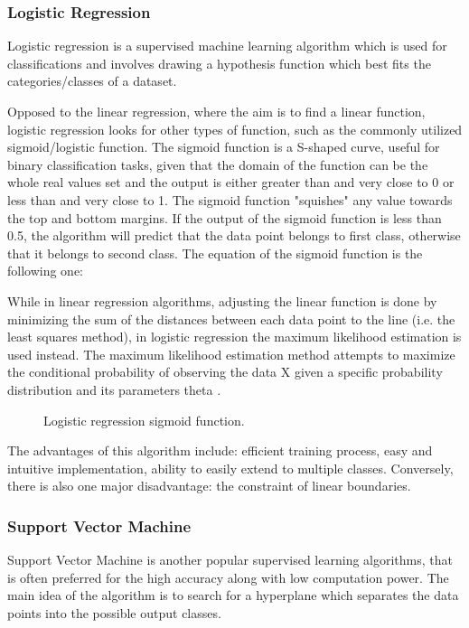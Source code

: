 \subsubsection{Logistic Regression}
Logistic regression is a supervised machine learning algorithm which is used for classifications and involves drawing a hypothesis function which best fits the categories/classes of a dataset. 

Opposed to the linear regression, where the aim is to find a linear function, logistic regression looks for other types of function, such as the commonly utilized sigmoid/logistic function. The sigmoid function is a S-shaped curve, useful for binary classification tasks, given that the domain of the function can be the whole real values set and the output is either greater than and very close to 0 or less than and very close to 1. The sigmoid function "squishes" any value towards the top and bottom margins. If the output of the sigmoid function is less than 0.5, the algorithm will predict that the data point belongs to first class, otherwise that it belongs to second class. The equation of the sigmoid function is the following one:

While in linear regression algorithms, adjusting the linear function is done by minimizing the sum of the distances between each data point to the line (i.e. the least squares method), in logistic regression the maximum likelihood estimation is used instead. The maximum likelihood estimation method attempts to maximize the conditional probability of observing the data X given a specific probability distribution and its parameters theta \cite{log_reg}.

\begin{figure}[h]
  \centering
  \caption{Logistic regression sigmoid function.}
\end{figure}

The advantages of this algorithm include: efficient training process, easy and intuitive implementation, ability to easily extend to multiple classes. Conversely, there is also one major disadvantage: the constraint of linear boundaries.

\subsubsection{Support Vector Machine}
Support Vector Machine is another popular supervised learning algorithms, that is often preferred for the high accuracy along with low computation power. The main idea of the algorithm is to search for a hyperplane which separates the data points into the possible output classes.

